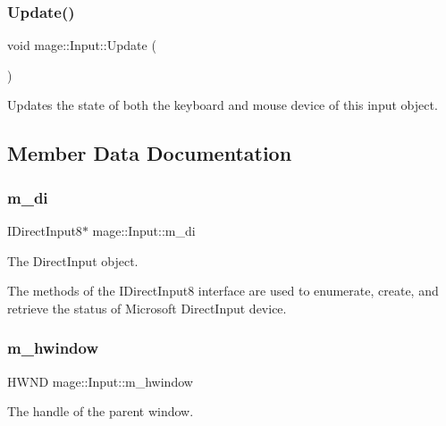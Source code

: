 \subsubsection{\texorpdfstring{Update()}{Update()}}
{\footnotesize\ttfamily void mage\+::\+Input\+::\+Update (\begin{DoxyParamCaption}{ }\end{DoxyParamCaption})}

Updates the state of both the keyboard and mouse device of this input object. 

\subsection{Member Data Documentation}
\hypertarget{classmage_1_1_input_a6169d17f5a782039c7aefd0ffc5ba1bf}{}\label{classmage_1_1_input_a6169d17f5a782039c7aefd0ffc5ba1bf} 
\subsubsection{\texorpdfstring{m\+\_\+di}{m\_di}}
{\footnotesize\ttfamily I\+Direct\+Input8$\ast$ mage\+::\+Input\+::m\+\_\+di\hspace{0.3cm}{\ttfamily [private]}}

The Direct\+Input object.

The methods of the I\+Direct\+Input8 interface are used to enumerate, create, and retrieve the status of Microsoft Direct\+Input device. \hypertarget{classmage_1_1_input_a1b33f0e27c18870391633b1883c3f615}{}\label{classmage_1_1_input_a1b33f0e27c18870391633b1883c3f615} 
\subsubsection{\texorpdfstring{m\+\_\+hwindow}{m\_hwindow}}
{\footnotesize\ttfamily H\+W\+ND mage\+::\+Input\+::m\+\_\+hwindow\hspace{0.3cm}{\ttfamily [private]}}

The handle of the parent window. \hypertarget{classmage_1_1_input_a383109c45d2a0b0edeb482de8b53d53b}{}\label{classmage_1_1_input_a383109c45d2a0b0edeb482de8b53d53b} 
